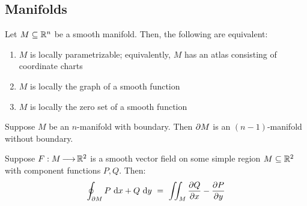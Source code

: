\subsection{Manifolds}

\begin{thm}[title=Equivalent Characterizations of Manifolds]
    Let $ M \subseteq \mathbb{R}^{n} $ be a smooth manifold. Then, the following are
    equivalent:
    \begin{enumerate}
        \item $ M $ is locally parametrizable; equivalently, $ M $ has an atlas
            consisting of coordinate charts
        \item $ M $ is locally the graph of a smooth function
        \item $ M $ is locally the zero set of a smooth function
    \end{enumerate}
\end{thm}

\begin{thm}[title=Boundary is a Manifold]
    Suppose $ M $ be an $ n $-manifold with boundary.
    Then $ \partial M $ is an $ (n-1) $-manifold without boundary.
\end{thm}

\begin{thm}[title=Green's Theorem]
    Suppose $ F: M \operatorname{\longrightarrow} \mathbb{R}^{2} $ is a smooth vector field on some simple
    region $ M \subseteq \mathbb{R}^{2} $ with component functions $ P, Q $. Then:
    \begin{equation*}
        \oint_{\partial M}P\textrm{ d} x + Q\textrm{ d} y \ = \
        \iint_{M}\frac{\partial Q}{\partial x}-\frac{\partial P}{\partial y}
    \end{equation*}
\end{thm}
